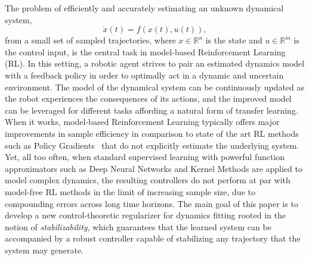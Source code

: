 \documentclass[conference]{svproc}
\newcommand{\reals}{\mathbb{R}}
\begin{document}
The problem of efficiently and accurately estimating an unknown dynamical system, \begin{equation}
    \dot{x}(t) = f(x(t),u(t)), 
\label{ode}
\end{equation} from a small set of sampled trajectories, where $x \in \reals^n$ is the state and $u \in \reals^m$ is the control input, is the central task in model-based Reinforcement Learning (RL). In this setting, a robotic agent strives to pair an estimated  dynamics model with a feedback policy in order to optimally act in a dynamic and uncertain environment.  The model of the dynamical system can be continuously updated as the robot experiences the consequences of its actions, and the improved model can be  leveraged for different tasks affording a natural form of transfer learning. When it works, model-based Reinforcement Learning typically offers major improvements in sample efficiency in comparison to state of the art RL methods such as Policy Gradients~\cite{ChuaCalandraEtAl2018,NagabandiKahnEtAl2017} that do not explicitly estimate the underlying system. Yet, all too often, when standard supervised learning with powerful function approximators such as Deep Neural Networks and Kernel Methods are applied to model complex dynamics, the resulting controllers do not perform at par with model-free RL methods in the limit of increasing sample size, due to compounding errors across long time horizons. The main goal of this paper is to develop a new control-theoretic regularizer for dynamics fitting rooted in the notion of {\it stabilizability}, which guarantees that the learned system can be accompanied by a robust controller capable of stabilizing any trajectory that the system may generate. 




\end{document}
